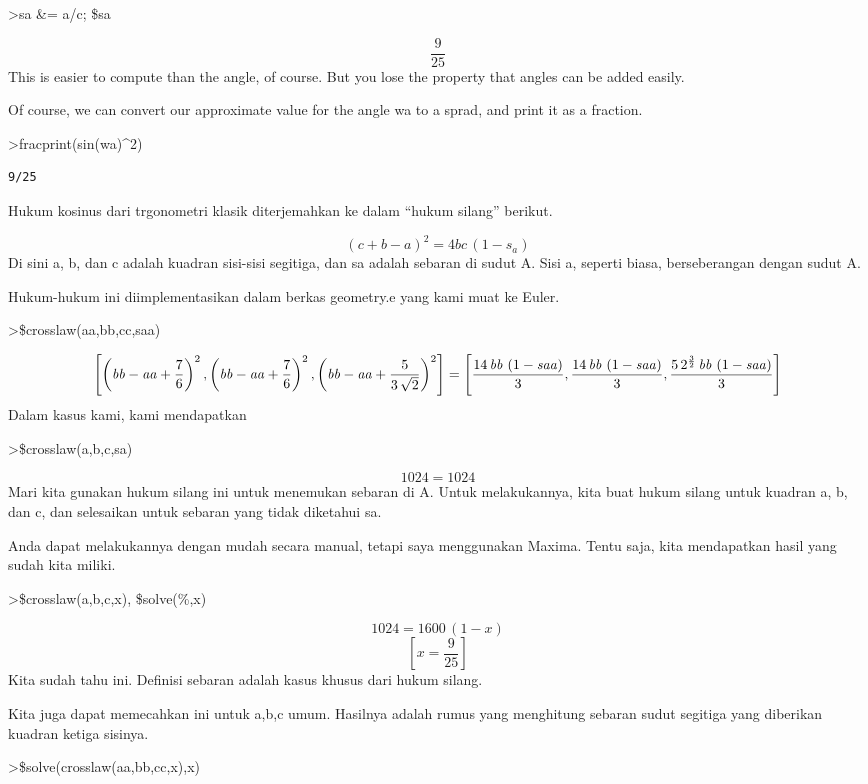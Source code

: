 \documentclass[
]{book}
\begin{document}
\textgreater sa \&= a/c; \$sa

\[\frac{9}{25}\]This is easier to compute than the angle, of course. But you lose the property that angles can be added easily.

Of course, we can convert our approximate value for the angle wa to a sprad, and print it as a fraction.

\textgreater fracprint(sin(wa)\^{}2)

\begin{verbatim}
9/25
\end{verbatim}

Hukum kosinus dari trgonometri klasik diterjemahkan ke dalam ``hukum silang'' berikut.

\[(c+b-a)^2 = 4 b c \, (1-s_a)\]Di sini a, b, dan c adalah kuadran sisi-sisi segitiga, dan sa adalah sebaran di sudut A. Sisi a, seperti biasa, berseberangan dengan sudut A.

Hukum-hukum ini diimplementasikan dalam berkas geometry.e yang kami muat ke Euler.

\textgreater\$crosslaw(aa,bb,cc,saa)

\[\left[ \left({\it bb}-{\it aa}+\frac{7}{6}\right)^2 , \left({\it bb}-{\it aa}+\frac{7}{6}\right)^2 , \left({\it bb}-{\it aa}+\frac{5}{3\,\sqrt{2}}\right)^2 \right] =\left[ \frac{14\,{\it bb}\,\left(1-{\it saa}\right)}{3} , \frac{14\,{\it bb}\,\left(1-{\it saa}\right)}{3} , \frac{5\,2^{\frac{3}{2}}\,{\it bb}\,\left(1-{\it saa}\right)}{3} \right]\]Dalam kasus kami, kami mendapatkan

\textgreater\$crosslaw(a,b,c,sa)

\[1024=1024\]Mari kita gunakan hukum silang ini untuk menemukan sebaran di A. Untuk melakukannya, kita buat hukum silang untuk kuadran a, b, dan c, dan selesaikan untuk sebaran yang tidak diketahui sa.

Anda dapat melakukannya dengan mudah secara manual, tetapi saya menggunakan Maxima. Tentu saja, kita mendapatkan hasil yang sudah kita miliki.

\textgreater\$crosslaw(a,b,c,x), \$solve(\%,x)

\[1024=1600\,\left(1-x\right)\] \[\left[ x=\frac{9}{25} \right]\]Kita sudah tahu ini. Definisi sebaran adalah kasus khusus dari hukum silang.

Kita juga dapat memecahkan ini untuk a,b,c umum. Hasilnya adalah rumus yang menghitung sebaran sudut segitiga yang diberikan kuadran ketiga sisinya.

\textgreater\$solve(crosslaw(aa,bb,cc,x),x)
\end{document}
